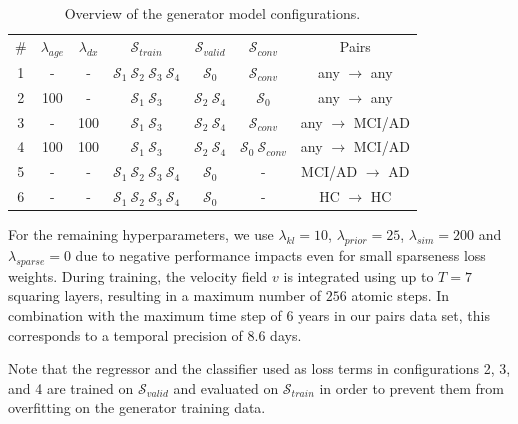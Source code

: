 \begin{table}[h]
	\begin{center}
		\begin{tabular}{c c c c c c c}
			\toprule
			\# & $\lambda_{age}$ & $\lambda_{dx}$ &
				$\mathcal{S}_{train}$ & $\mathcal{S}_{valid}$ & $\mathcal{S}_{conv}$ & Pairs \\
			\cmidrule(lr){1-7}
			1 &  -  &  -  & $\mathcal{S}_1\:\mathcal{S}_2\:\mathcal{S}_3\:\mathcal{S}_4$ &
				      $\mathcal{S}_0$ &
				      $\mathcal{S}_{conv}$ &
				      \footnotesize any $\rightarrow$ any \\
			2 & 100 &  -  & $\mathcal{S}_1\:\mathcal{S}_3$ & 
				      $\mathcal{S}_2\:\mathcal{S}_4$ &
				      $\mathcal{S}_0$ & 
				      \footnotesize any $\rightarrow$ any \\
			3 &  -  & 100 & $\mathcal{S}_1\:\mathcal{S}_3$ & 
				      $\mathcal{S}_2\:\mathcal{S}_4$ &
				      $\mathcal{S}_{conv}$ & 
				      \footnotesize any $\rightarrow$ MCI/AD \\
			4 & 100 & 100 & $\mathcal{S}_1\:\mathcal{S}_3$ & 
				      $\mathcal{S}_2\:\mathcal{S}_4$ &
				      $\mathcal{S}_0\:\mathcal{S}_{conv}$ &
				      \footnotesize any $\rightarrow$ MCI/AD \\
			5 &  -  &  -  & $\mathcal{S}_1\:\mathcal{S}_2\:\mathcal{S}_3\:\mathcal{S}_4$ &
				      $\mathcal{S}_0$ &
				      - &
				      \footnotesize MCI/AD $\rightarrow$ AD \\
			6 &  -  &  -  & $\mathcal{S}_1\:\mathcal{S}_2\:\mathcal{S}_3\:\mathcal{S}_4$ &
				      $\mathcal{S}_0$ &
				      - &
				      \footnotesize HC $\rightarrow$ HC \\
			\bottomrule
		\end{tabular}
		\caption{Overview of the generator model configurations.}
		\label{tab:ganconfig}
	\end{center}
\end{table}

For the remaining hyperparameters, we use $\lambda_{kl} = 10$, $\lambda_{prior} = 25$, $\lambda_{sim} = 200$ and $\lambda_{sparse} = 0$ due to negative performance impacts even for small sparseness loss weights. During training, the velocity field $v$ is integrated using up to $T = 7$ squaring layers, resulting in a maximum number of $256$ atomic steps. In combination with the maximum time step of 6 years in our pairs data set, this corresponds to a temporal precision of 8.6 days.

Note that the regressor and the classifier used as loss terms in configurations 2, 3, and 4 are trained on $\mathcal{S}_{valid}$ and evaluated on $\mathcal{S}_{train}$ in order to prevent them from overfitting on the generator training data.

